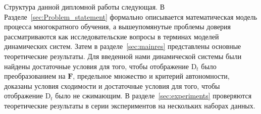 Структура данной дипломной работы следующая. В Разделе~\ref{sec:Problem_statement} формально описывается математическая модель процесса многократного обучения, а вышеупомянутые проблемы доверия рассматриваются как исследовательские вопросы в терминах моделей динамических систем. Затем в разделе~\ref{sec:mainres} представлены основные теоретические результаты. Для введенной нами динамической системы были найдены достаточные условия для того, чтобы отображение $\text{D}_t$ было преобразованием на $\textbf{F}$, предельное множество и критерий автономности, доказаны условия сходимости и достаточные условия для того, чтобы отображение $\text{D}_t$ было не сжимающим. В разделе~\ref{sec:experiments} проверяются теоретические результаты в серии экспериментов на нескольких наборах данных.